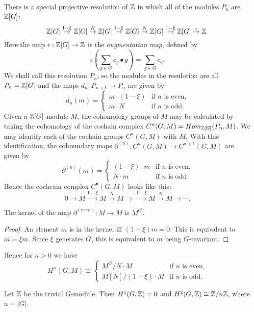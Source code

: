 There is a special projective resolution of $\mathbb Z$ in which all of the modules $P_n$ are $\mathbb Z[G]$:
\[
  \mathbb Z[G] \stackrel{1-\xi} \to \mathbb Z[G] \stackrel{N}\to \mathbb Z[G] \stackrel{1-\xi}
  \to \mathbb Z[G] \stackrel{N}\to \mathbb Z[G] \stackrel{1-\xi} \to \mathbb Z[G] \stackrel{\epsilon}\to \mathbb Z.
\]
Here the map $\epsilon : \mathbb Z[G] \to \mathbb Z$ is the \emph{augmentation map}, defined by
\[
  \epsilon \left(\sum_{g \in G} c_g \bullet g\right) = \sum_{g \in G} c_g.
\]
We shall call this resolution $P_n$, so the modules in the resulotion are all $P_n = \mathbb Z[G]$
and the maps $d_n : P_{n+1} \to P_n$ are given by
\[
  d_n(m) = \begin{cases}
    m \cdot (1-\xi) & \text{if $n$ is even,}\\
    m \cdot N & \text{if $n$ is odd.}
  \end{cases}
\]
Given a $\mathbb Z[G]$-module $M$, the cohomology groups of $M$ may be calculated by
taking the cohomology of the cochain complex $C^n(G,M) = Hom_{\mathbb Z[G]}(P_n,M)$.
We may identify each of the cochain groups $C^n(G,M)$ with $M$. With this
identification, the coboundary maps $\partial^{(n)} : C^n(G,M) \to C^{n+1}(G,M)$ are given by
\[
  \partial^{(n)} (m) = \begin{cases}
    (1-\xi) \cdot m & \text{if $n$ is even,}\\
    N \cdot m & \text{if $n$ is odd.}
  \end{cases}
\]
Hence the cochcain complex $C^\bullet(G,M)$ looks like this:
\[
  0 \to M \stackrel{1-\xi}\to M \stackrel{N} \to M \to
    \stackrel{1-\xi}\to M \stackrel{N} \to M \to \cdots.
\]

\begin{lemma}
  The kernel of the map $\partial^{(even)}: M \to M$
  is $M^G$.
\end{lemma}

\begin{proof}
  An element $m$ is in the kernel iff $(1-\xi)m=0$.
  This is equivalent to $m=\xi m$. Since $\xi$ generates $G$, this is
  equivalent to $m$ being $G$-invariant.
\end{proof}

Hence for $n > 0$ we have
\[
  H^n(G,M) \cong \begin{cases}
    M^G / N\cdot M & \text{if $n$ is even,}\\
    M[N] / (1-\xi) \cdot M & \text{if $n$ is odd.}
  \end{cases}
\]

\begin{theorem}\label{cyclic group cohomology with values in Z}
  Let $\mathbb Z$ be the trivial $G$-module.
  Then $H^1(G,\mathbb Z)=0$ and $H^2(G,\mathbb Z) \cong \mathbb Z/n\mathbb Z$, where $n = |G|$.
\end{theorem}

